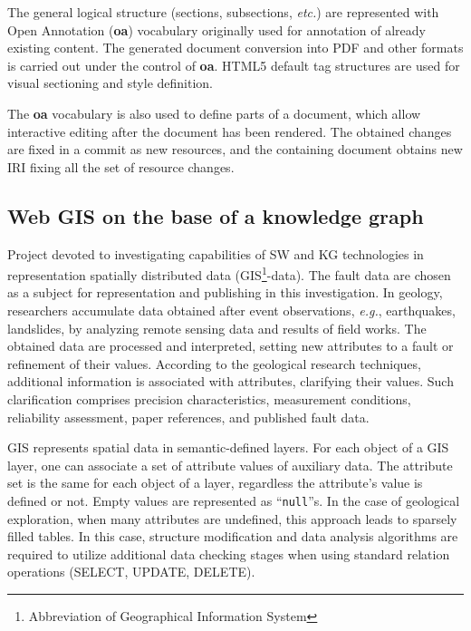 \documentclass[
]{ceurart}
\begin{document}
The general logical structure (sections, subsections, \emph{etc.}) are represented with Open Annotation (\textbf{oa}) vocabulary originally used for annotation of already existing content. The generated document conversion into PDF and other formats is carried out under the control of \textbf{oa}.  HTML5 default tag structures are used for visual sectioning and style definition.

The \textbf{oa} vocabulary is also used to define parts of a document, which allow interactive editing after the document has been rendered.  The obtained changes are fixed in a commit as new resources, and the containing document obtains new IRI fixing all the set of resource changes.

\subsection{Web GIS on the base of a knowledge graph}
\label{sec:gis-impl}

Project \cite{gisviewer} devoted to investigating capabilities of SW and KG technologies in representation spatially distributed data (GIS\footnote{Abbreviation of Geographical Information System}-data).  The fault data \cite{lunina,afs} are chosen as a subject for representation and publishing in this investigation.  In geology, researchers accumulate data obtained after event observations, \emph{e.g.}, earthquakes, landslides, by analyzing remote sensing data and results of field works.  The obtained data are processed and interpreted, setting new attributes to a fault or refinement of their values.  According to the geological research techniques, additional information is associated with attributes, clarifying their values.  Such clarification comprises precision characteristics, measurement conditions, reliability assessment, paper references, and published fault data.

GIS represents spatial data in semantic-defined layers.  For each object of a GIS layer, one can associate a set of attribute values of auxiliary data.  The attribute set is the same for each object of a layer, regardless the attribute's value is defined or not.  Empty values are represented as ``\texttt{null}''s.  In the case of geological exploration, when many attributes are undefined, this approach leads to sparsely filled tables.  In this case, structure modification and data analysis algorithms are required to utilize additional data checking stages when using standard relation operations (SELECT, UPDATE, DELETE).
\end{document}
